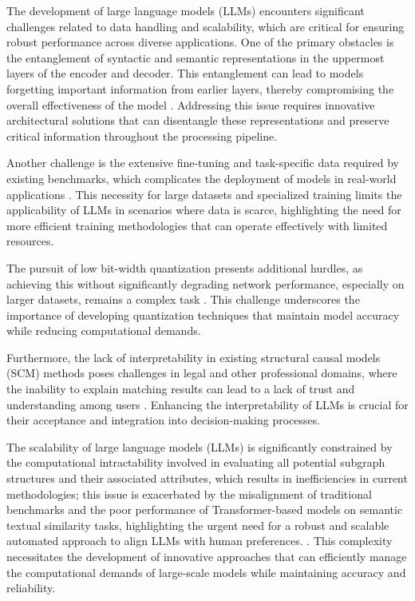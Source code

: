 The development of large language models (LLMs) encounters significant challenges related to data handling and scalability, which are critical for ensuring robust performance across diverse applications. One of the primary obstacles is the entanglement of syntactic and semantic representations in the uppermost layers of the encoder and decoder. This entanglement can lead to models forgetting important information from earlier layers, thereby compromising the overall effectiveness of the model \cite{zheng2023layerwiserepresentationfusioncompositional}. Addressing this issue requires innovative architectural solutions that can disentangle these representations and preserve critical information throughout the processing pipeline.



Another challenge is the extensive fine-tuning and task-specific data required by existing benchmarks, which complicates the deployment of models in real-world applications \cite{chowdhery2023palm}. This necessity for large datasets and specialized training limits the applicability of LLMs in scenarios where data is scarce, highlighting the need for more efficient training methodologies that can operate effectively with limited resources.



The pursuit of low bit-width quantization presents additional hurdles, as achieving this without significantly degrading network performance, especially on larger datasets, remains a complex task \cite{yin2017quantizationtraininglowbitwidth}. This challenge underscores the importance of developing quantization techniques that maintain model accuracy while reducing computational demands.



Furthermore, the lack of interpretability in existing structural causal models (SCM) methods poses challenges in legal and other professional domains, where the inability to explain matching results can lead to a lack of trust and understanding among users \cite{lin2023interpretabilityframeworksimilarcase}. Enhancing the interpretability of LLMs is crucial for their acceptance and integration into decision-making processes.



The scalability of large language models (LLMs) is significantly constrained by the computational intractability involved in evaluating all potential subgraph structures and their associated attributes, which results in inefficiencies in current methodologies; this issue is exacerbated by the misalignment of traditional benchmarks and the poor performance of Transformer-based models on semantic textual similarity tasks, highlighting the urgent need for a robust and scalable automated approach to align LLMs with human preferences. \cite{ginzburg2021selfsuperviseddocumentsimilarityranking,JudgingLLM2}. This complexity necessitates the development of innovative approaches that can efficiently manage the computational demands of large-scale models while maintaining accuracy and reliability.



